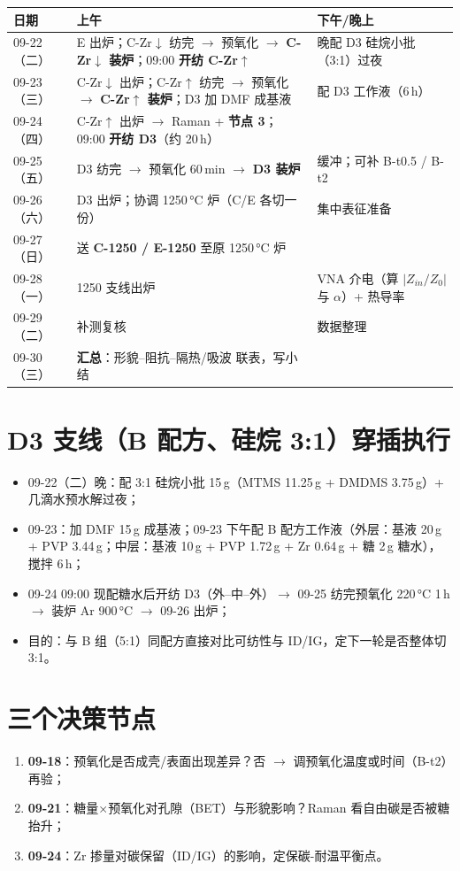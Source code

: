 \documentclass[a4paper, 11pt]{ctexart}
\begin{document}
\begin{tabular}{p{2.1cm}p{6.4cm}p{6.4cm}}
\toprule
日期 & 上午 & 下午/晚上 \\
\midrule
09-22（二）& E 出炉；C-Zr$\downarrow$ 纺完 $\rightarrow$ 预氧化 $\rightarrow$ \textbf{C-Zr$\downarrow$ 装炉}；09:00 \textbf{开纺 C-Zr$\uparrow$} & 晚配 D3 硅烷小批（3:1）过夜 \\
09-23（三）& C-Zr$\downarrow$ 出炉；C-Zr$\uparrow$ 纺完 $\rightarrow$ 预氧化 $\rightarrow$ \textbf{C-Zr$\uparrow$ 装炉}；D3 加 DMF 成基液 & 配 D3 工作液（6\,h）\\
09-24（四）& C-Zr$\uparrow$ 出炉 $\rightarrow$ Raman + \textbf{节点 3}；09:00 \textbf{开纺 D3}（约 20\,h）& \\
09-25（五）& D3 纺完 $\rightarrow$ 预氧化 60\,min $\rightarrow$ \textbf{D3 装炉} & 缓冲；可补 B-t0.5 / B-t2 \\
09-26（六）& D3 出炉；协调 1250\,°C 炉（C/E 各切一份）& 集中表征准备 \\
09-27（日）& 送 \textbf{C-1250 / E-1250} 至原 1250\,°C 炉 & \\
09-28（一）& 1250 支线出炉 & VNA 介电（算 $|Z_{in}/Z_0|$ 与 $\alpha$）+ 热导率 \\
09-29（二）& 补测复核 & 数据整理 \\
09-30（三）& \textbf{汇总}：形貌--阻抗--隔热/吸波 联表，写小结 & \\
\bottomrule
\end{tabular}

\section*{D3 支线（B 配方、硅烷 3:1）穿插执行}
\begin{itemize}[itemsep=1pt, parsep=0pt]
  \item 09-22（二）晚：配 3:1 硅烷小批 15\,g（MTMS 11.25\,g + DMDMS 3.75\,g）+ 几滴水预水解过夜；
  \item 09-23：加 DMF 15\,g 成基液；09-23 下午配 B 配方工作液（外层：基液 20\,g + PVP 3.44\,g；中层：基液 10\,g + PVP 1.72\,g + Zr 0.64\,g + 糖 2\,g 糖水），搅拌 6\,h；
  \item 09-24 09:00 现配糖水后开纺 D3（外--中--外）$\rightarrow$ 09-25 纺完预氧化 220\,°C 1\,h $\rightarrow$ 装炉 Ar 900\,°C $\rightarrow$ 09-26 出炉；
  \item 目的：与 B 组（5:1）同配方直接对比可纺性与 ID/IG，定下一轮是否整体切 3:1。
\end{itemize}

\section*{三个决策节点}
\begin{enumerate}[itemsep=2pt]
  \item \textbf{09-18}：预氧化是否成壳/表面出现差异？否 $\rightarrow$ 调预氧化温度或时间（B-t2）再验；
  \item \textbf{09-21}：糖量×预氧化对孔隙（BET）与形貌影响？Raman 看自由碳是否被糖抬升；
  \item \textbf{09-24}：Zr 掺量对碳保留（ID/IG）的影响，定保碳-耐温平衡点。
\end{enumerate}
\end{document}
